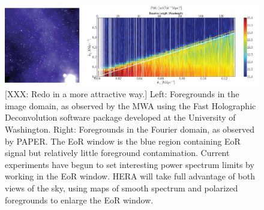 \documentclass[preprint]{aastex}
\begin{document}


\begin{figure}[!ht]\centering
\includegraphics[width=1.0\textwidth]{plots/twoFgViews.png}
\caption{\small
[XXX: Redo in a more attractive way.]
Left: Foregrounds in the image domain, as observed by the MWA using the Fast Holographic Deconvolution software package developed at the University of Washington.  Right: Foregrounds in the Fourier domain, as observed by PAPER.  The EoR window is the blue region containing EoR signal but relatively little foreground contamination.  Current experiments have begun to set interesting power spectrum limits by working in the EoR window.  HERA will take full advantage of both views of the sky, using maps of smooth spectrum and polarized foregrounds to enlarge the EoR window.
}\label{fig:twoFGViews}
\end{figure}




\vspace{-0.25in}
\end{document}
